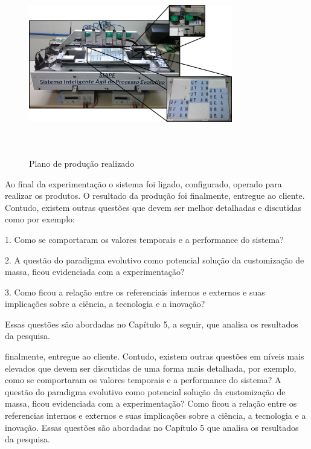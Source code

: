 \documentclass[10pt,letterpaper,twocolumn]{IEEEtran}
\begin{document}
	\begin{figure}[!h]
		\centering
		\includegraphics[width=8.9cm, height=8cm]{MeDSE_imagens/F115_SIAPE_Finalizacao_do_Plano_de_Producao.jpg} 
		\caption{Plano de produção realizado}
		\label{F115}
	\end{figure}
	
	Ao final da experimentação o sistema foi ligado, configurado, operado para realizar os produtos. O 
	resultado da produção foi finalmente,   entregue ao cliente. Contudo, existem outras questões que 
	devem ser melhor detalhadas e discutidas como por exemplo:\par 
	1. Como se comportaram os valores temporais e a performance do sistema? \par 
	2. A questão do paradigma evolutivo como potencial solução da customização de massa, ficou evidenciada 
	com a experimentação?\par 
	3. Como ficou a relação entre os referenciais internos e externos e suas  implicações sobre a ciência, 
	a tecnologia e a inovação? \par 
	Essas questões são abordadas no Capítulo 5, a seguir, que analisa os resultados da pesquisa. 
	
	finalmente,   entregue ao cliente. Contudo, existem outras questões em níveis mais elevados que devem 
	ser discutidas de uma forma mais detalhada, por exemplo, como se comportaram os valores temporais e a 
	performance do sistema? A questão do paradigma evolutivo como potencial solução da customização de 
	massa, ficou evidenciada com a experimentação? Como ficou a relação entre os referencias internos e 
	externos e suas  implicações sobre a ciência, a tecnologia e a inovação. Essas questões são abordadas 
	no Capítulo 5 que analisa os resultados da pesquisa. 
\end{document}
